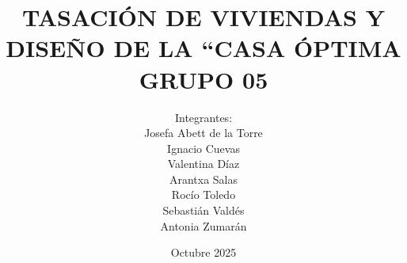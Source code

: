 \documentclass[pdftex]{pucthesis}	%
\begin{document}

\title[TASACIÓN DE VIVIENDAS Y DISEÑO DE LA “CASA ÓPTIMA\\ GRUPO 05]
   {\bf TASACIÓN DE VIVIENDAS Y DISEÑO DE LA “CASA ÓPTIMA\\ GRUPO 05}       
\author[Integrantes:]{Integrantes:\\
\textnormal{\small{
Josefa Abett de la Torre\\
Ignacio Cuevas\\
Valentina Díaz\\
Arantxa Salas\\
Rocío Toledo\\
Sebastián Valdés\\
Antonia Zumarán}
}
}

\address{Escuela de Ingenier\'ia\\
                   Pontificia Universidad Cat\'olica de Chile\\ 
                   Vicu\~na Mackenna 4860\\
                  Santiago, Chile\\
                  {\it Tel.\/} : 56 (2) 354-2000}


\date                                 {Octubre 2025}


\NoChapterPageNumber
{}
\maketitle



\end{document}
